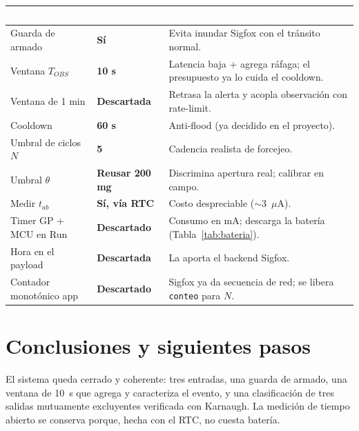 \documentclass[11pt,a4paper]{article}
\newcommand{\dec}[1]{\textcolor{Green0G}{\textbf{#1}}}
\newcommand{\desc}[1]{\textcolor{Red0G}{\textbf{#1}}}
\begin{document}
\begin{center}
\renewcommand{\arraystretch}{1.3}
\begin{tabularx}{\linewidth}{@{}l l X@{}}
\toprule
\rowcolor{Indigo0G}
\textcolor{white}{\textbf{Tema}} & \textcolor{white}{\textbf{Decisión}} & \textcolor{white}{\textbf{Razón}} \\
\midrule
Guarda de armado          & \dec{Sí}             & Evita inundar Sigfox con el tránsito normal. \\
\rowcolor{Light0G}
Ventana $T_{OBS}$         & \dec{10 s}           & Latencia baja + agrega ráfaga; el presupuesto ya lo cuida el cooldown. \\
Ventana de 1 min          & \desc{Descartada}    & Retrasa la alerta y acopla observación con rate-limit. \\
\rowcolor{Light0G}
Cooldown                  & \dec{60 s}           & Anti-flood (ya decidido en el proyecto). \\
Umbral de ciclos $N$      & \dec{5}              & Cadencia realista de forcejeo. \\
\rowcolor{Light0G}
Umbral $\theta$           & \dec{Reusar 200 mg}  & Discrimina apertura real; calibrar en campo. \\
Medir $t_{ab}$            & \dec{Sí, vía RTC}    & Costo despreciable ($\sim$3~$\mu$A). \\
\rowcolor{Light0G}
Timer GP + MCU en Run     & \desc{Descartado}    & Consumo en mA; descarga la batería (Tabla~\ref{tab:bateria}). \\
Hora en el payload        & \desc{Descartada}    & La aporta el backend Sigfox. \\
\rowcolor{Light0G}
Contador monotónico app   & \desc{Descartado}    & Sigfox ya da secuencia de red; se libera \texttt{conteo} para $N$. \\
\bottomrule
\end{tabularx}
\end{center}

\section{Conclusiones y siguientes pasos}

El sistema queda cerrado y coherente: tres entradas, una guarda de armado, una
ventana de 10~s que agrega y caracteriza el evento, y una clasificación de tres
salidas mutuamente excluyentes verificada con Karnaugh. La medición de tiempo
abierto se conserva porque, hecha con el RTC, no cuesta batería.
\end{document}
